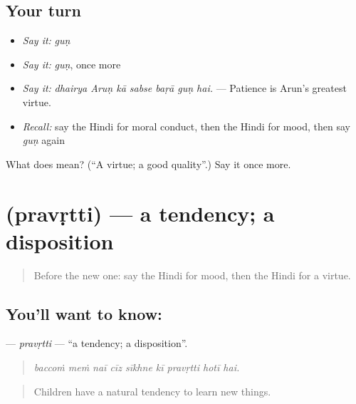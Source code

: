 \subsection*{Your turn}
\begin{itemize}
\raggedright
  \item \emph{Say it:} \emph{guṇ}
  \item \emph{Say it:} \emph{guṇ}, once more
  \item \emph{Say it:} \emph{dhairya Aruṇ kā sabse baṛā guṇ hai.} — Patience is Arun's greatest virtue.
  \item \emph{Recall:} say the Hindi for moral conduct, then the Hindi for mood, then say \emph{guṇ} again
\end{itemize}

\begin{tcolorbox}[breakable,colback=teal!4,colframe=teal!35!black,title={Before you move on}]
What does  mean? (\textquotedblleft{}A virtue; a good quality\textquotedblright{}.) Say it once more.
\end{tcolorbox}
\section[\texorpdfstring{\hi{प्रवृत्ति} (pravṛtti)}{प्रवृत्ति (pravṛtti)}]{ (pravṛtti) — a tendency; a disposition}

\label{lesson:HI-C475-pravrtti}



\begin{quote}
Before the new one: say the Hindi for mood, then the Hindi for a virtue.
\end{quote}

\subsection*{You'll want to know: }
\textbf{} — \emph{pravṛtti} — \textquotedblleft{}a tendency; a disposition\textquotedblright{}.

\begin{quote}
        
\end{quote}

\begin{quote}
\emph{baccoṁ meṁ naī cīz sīkhne kī pravṛtti hotī hai.}
\end{quote}

\begin{quote}
Children have a natural tendency to learn new things.
\end{quote}

